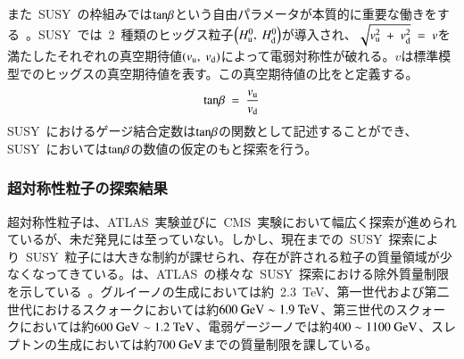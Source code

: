 また~SUSY~の枠組みでは$\rm{tan}\beta$という自由パラメータが本質的に重要な働きをする~\cite{URL:24}。SUSY~では~2~種類のヒッグス粒子$\left(H_{\rm{u}}^0,~H_{\rm{d}}^0\right)$が導入され、$\sqrt{v_{\rm{u}}^2~+~v_{\rm{d}}^2}~=~v$を満たしたそれぞれの真空期待値$(v_{\rm{u}},~v_{\rm{d}})$によって電弱対称性が破れる。$v$は標準模型でのヒッグスの真空期待値を表す。この真空期待値の比をと定義する。
\begin{align}
    \rm{tan}\beta~=~\frac{\it v_{\rm{u}}}{\it v_{\rm{d}}} \label{eq:tan}
\end{align}
SUSY~におけるゲージ結合定数は$\rm{tan}\beta$の関数として記述することができ、SUSY~においては$\rm{tan}\beta$の数値の仮定のもと探索を行う。

\subsubsection{超対称性粒子の探索結果}
超対称性粒子は、ATLAS~実験並びに~CMS~実験において幅広く探索が進められているが、未だ発見には至っていない。しかし、現在までの~SUSY~探索により~SUSY~粒子には大きな制約が課せられ、存在が許される粒子の質量領域が少なくなってきている。は、ATLAS~の様々な~SUSY~探索における除外質量制限を示している~\cite{AR:13e}。グルイーノの生成においては約~2.3~TeV、第一世代および第二世代におけるスクォークにおいては約$\rm{600~GeV\sim1.9~TeV}$、第三世代のスクォークにおいては約$\rm{600~GeV\sim1.2~TeV}$、電弱ゲージーノでは約$\rm{400\sim1100~GeV}$、スレプトンの生成においては約$\rm{700~GeV}$までの質量制限を課している。

